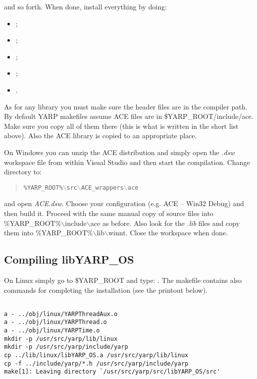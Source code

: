 and so forth. When done, install everything by doing:

\begin{itemize}
\item {};
\item {};
\item {};
\item {};
\item {}.
\end{itemize}

As for any library you must make sure the header files are in the compiler path. By default YARP makefiles assume ACE files are in \$YARP\_ROOT/include/ace. Make sure you copy all of them there (this is what is written in the short list above). Also the ACE library is copied to an appropriate place. 

On Windows you can unzip the ACE distribution and simply open the {\em .dsw} workspace file from within Visual Studio and then start the compilation. Change directory to:

\begin{quote}
{\tt \%YARP\_ROOT\%$\backslash$src$\backslash$ACE\_wrappers$\backslash$ace}
\end{quote}
 
\noindent and open {\em ACE.dsw}. Choose your configuration (e.g. ACE -- Win32 Debug) and then build it. Proceed with the same manual copy of source files into \%YARP\_ROOT\%$\backslash$include$\backslash$ace as before. Also look for the {\em *.lib} files and copy them into \%YARP\_ROOT\%$\backslash$lib$\backslash$winnt. Close the workspace when done.


\subsection{Compiling libYARP\_OS}

On Linux simply go to \$YARP\_ROOT and type: . The makefile contains also commands for completing the installation (see the printout below). 
\begin{verbatim}

a - ../obj/linux/YARPThreadAux.o
a - ../obj/linux/YARPThread.o
a - ../obj/linux/YARPTime.o
mkdir -p /usr/src/yarp/lib/linux
mkdir -p /usr/src/yarp/include/yarp
cp ../lib/linux/libYARP_OS.a /usr/src/yarp/lib/linux
cp -f ../include/yarp/*.h /usr/src/yarp/include/yarp
make[1]: Leaving directory `/usr/src/yarp/src/libYARP_OS/src'

\end{verbatim}

